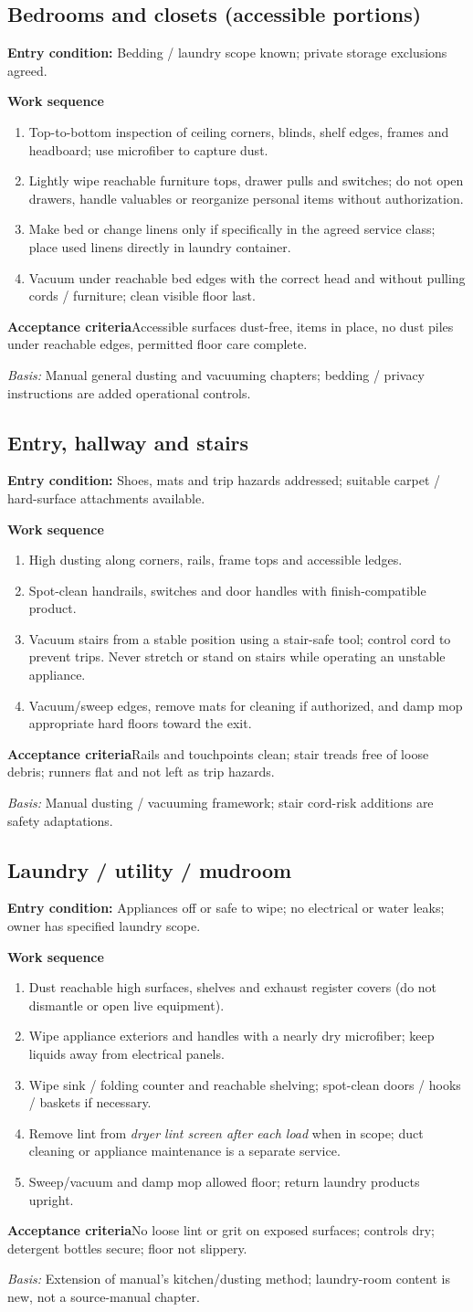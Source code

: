 \documentclass[10pt,letterpaper,oneside]{article}
\newcommand{\subtle}[1]{{\color{graytext}\small #1}}
\newcommand{\sop}[3]{\Needspace{8\baselineskip}\subsection{#1}\subtle{\textbf{Entry condition:} #2}\par\textbf{Work sequence}\begin{enumerate}#3\end{enumerate}}
\newcommand{\accept}[1]{\begin{notebox}\textbf{Acceptance criteria}\quad #1\end{notebox}}
\newcommand{\sources}[1]{\par{\small\color{graytext}\textit{Basis:} #1}\par}
\begin{document}
\sop{Bedrooms and closets (accessible portions)}{Bedding / laundry scope known; private storage exclusions agreed.}{
\item Top-to-bottom inspection of ceiling corners, blinds, shelf edges, frames and headboard; use microfiber to capture dust.
\item Lightly wipe reachable furniture tops, drawer pulls and switches; do not open drawers, handle valuables or reorganize personal items without authorization.
\item Make bed or change linens only if specifically in the agreed service class; place used linens directly in laundry container.
\item Vacuum under reachable bed edges with the correct head and without pulling cords / furniture; clean visible floor last.}
\accept{Accessible surfaces dust-free, items in place, no dust piles under reachable edges, permitted floor care complete.}
\sources{Manual general dusting and vacuuming chapters; bedding / privacy instructions are added operational controls.}

\sop{Entry, hallway and stairs}{Shoes, mats and trip hazards addressed; suitable carpet / hard-surface attachments available.}{
\item High dusting along corners, rails, frame tops and accessible ledges.
\item Spot-clean handrails, switches and door handles with finish-compatible product.
\item Vacuum stairs from a stable position using a stair-safe tool; control cord to prevent trips. Never stretch or stand on stairs while operating an unstable appliance.
\item Vacuum/sweep edges, remove mats for cleaning if authorized, and damp mop appropriate hard floors toward the exit.}
\accept{Rails and touchpoints clean; stair treads free of loose debris; runners flat and not left as trip hazards.}
\sources{Manual dusting / vacuuming framework; stair cord-risk additions are safety adaptations.}

\sop{Laundry / utility / mudroom}{Appliances off or safe to wipe; no electrical or water leaks; owner has specified laundry scope.}{
\item Dust reachable high surfaces, shelves and exhaust register covers (do not dismantle or open live equipment).
\item Wipe appliance exteriors and handles with a nearly dry microfiber; keep liquids away from electrical panels.
\item Wipe sink / folding counter and reachable shelving; spot-clean doors / hooks / baskets if necessary.
\item Remove lint from \emph{dryer lint screen after each load} when in scope; duct cleaning or appliance maintenance is a separate service.
\item Sweep/vacuum and damp mop allowed floor; return laundry products upright.}
\accept{No loose lint or grit on exposed surfaces; controls dry; detergent bottles secure; floor not slippery.}
\sources{Extension of manual's kitchen/dusting method; laundry-room content is new, not a source-manual chapter.}
\end{document}
